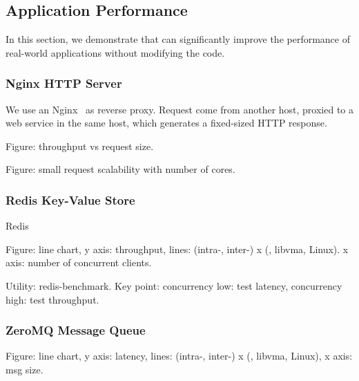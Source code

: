 \subsection{Application Performance}
\label{subsec:application}

In this section, we demonstrate that \sys{} can significantly improve the performance of real-world applications without modifying the code.

\subsubsection{Nginx HTTP Server}
\quad

We use an Nginx~\cite{nginx} as reverse proxy. Request come from another host, proxied to a web service in the same host, which generates a fixed-sized HTTP response.

Figure: throughput vs request size.

Figure: small request scalability with number of cores.

\subsubsection{Redis Key-Value Store}
\quad

Redis~\cite{redis}

Figure: line chart, y axis: throughput, lines: (intra-, inter-) x (\sys{}, libvma, Linux). x axis: number of concurrent clients.

Utility: redis-benchmark.
Key point: concurrency low: test latency, concurrency high: test throughput.





\subsubsection{ZeroMQ Message Queue}
\quad

Figure: line chart, y axis: latency, lines: (intra-, inter-) x (\sys{}, libvma, Linux), x axis: msg size.

